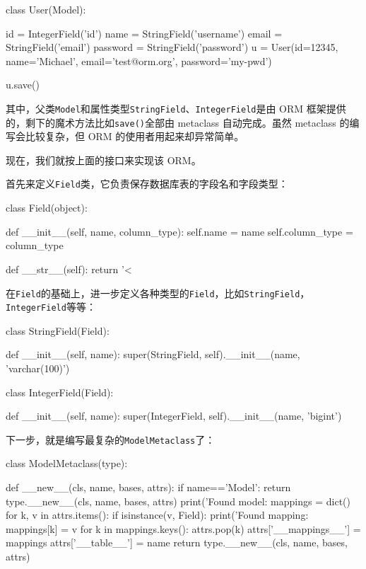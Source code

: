 \begin{pythoncode}
class User(Model):
    
    id = IntegerField('id')
    name = StringField('username')
    email = StringField('email')
    password = StringField('password')
u = User(id=12345, name='Michael', email='test@orm.org', password='my-pwd')

u.save()
\end{pythoncode}

其中，父类\texttt{Model}和属性类型\texttt{StringField}、\texttt{IntegerField}是由
ORM 框架提供的，剩下的魔术方法比如\texttt{save()}全部由 metaclass
自动完成。虽然 metaclass 的编写会比较复杂，但 ORM
的使用者用起来却异常简单。

现在，我们就按上面的接口来实现该 ORM。

首先来定义\texttt{Field}类，它负责保存数据库表的字段名和字段类型：

\begin{pythoncode}
class Field(object):

    def __init__(self, name, column_type):
        self.name = name
        self.column_type = column_type

    def __str__(self):
        return '<%
\end{pythoncode}

在\texttt{Field}的基础上，进一步定义各种类型的\texttt{Field}，比如\texttt{StringField}，\texttt{IntegerField}等等：

\begin{pythoncode}
class StringField(Field):

    def __init__(self, name):
        super(StringField, self).__init__(name, 'varchar(100)')

class IntegerField(Field):

    def __init__(self, name):
        super(IntegerField, self).__init__(name, 'bigint')
\end{pythoncode}

下一步，就是编写最复杂的\texttt{ModelMetaclass}了：

\begin{pythoncode}
class ModelMetaclass(type):

    def __new__(cls, name, bases, attrs):
        if name=='Model':
            return type.__new__(cls, name, bases, attrs)
        print('Found model: %
        mappings = dict()
        for k, v in attrs.items():
            if isinstance(v, Field):
                print('Found mapping: %
                mappings[k] = v
        for k in mappings.keys():
            attrs.pop(k)
        attrs['__mappings__'] = mappings 
        attrs['__table__'] = name 
        return type.__new__(cls, name, bases, attrs)
\end{pythoncode}


